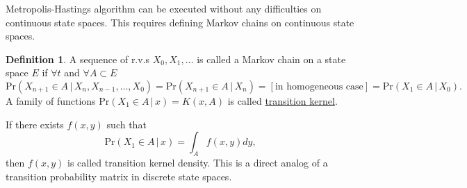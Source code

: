 \documentclass[11pt]{article}\usepackage[]{graphicx}\usepackage[]{color}
\numberwithin{algorithm}{section}
\newcommand{\cprob}[2]{\ensuremath{\text{Pr}\left(#1 \,|\,#2\right)}}
\theoremstyle{remark}
\theoremstyle{definition}
\newtheorem*{define}{Definition}
\begin{document}
Metropolis-Hastings algorithm can be executed without any difficulties on continuous
state spaces. This requires defining Markov chains on continuous state spaces. 
\begin{define}
  A sequence of r.v.s $X_0, X_1, \dots$ is called a Markov chain on a state space $E$ if 
  $\forall t$ and $\forall A \subset E$
  \[
  \cprob{X_{n+1} \in A}{X_n,X_{n-1},\dots,X_0} = \cprob{X_{n+1} \in A}{X_n} = [\text{in homogeneous case}]
    = \cprob{X_1 \in A}{X_0}.
  \]
  A family of functions $\cprob{X_1 \in A}{x} = K(x,A)$ is called \underline{transition kernel}.
  \par
  If there exists $f(x,y)$ such that 
  \[
  \cprob{X_1 \in A}{x} = \int_A f(x,y)dy,
  \]
  then $f(x,y)$ is called transition kernel density. This is a direct analog of a transition probability
  matrix in discrete state spaces.
\end{define}
\end{document}
